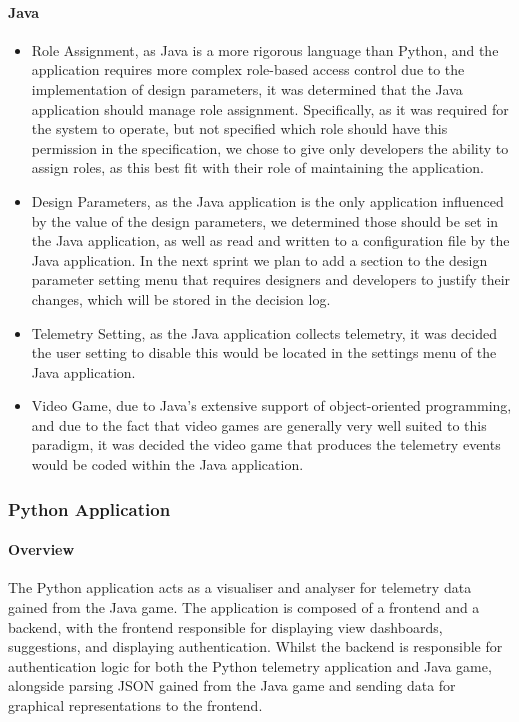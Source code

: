 \paragraph{Java}
\begin{itemize}
    \item Role Assignment, as Java is a more rigorous language than Python, and the application requires more complex role-based access control due to the implementation of design parameters, it was determined that the Java application should manage role assignment. Specifically, as it was required for the system to operate, but not specified which role should have this permission in the specification, we chose to give only developers the ability to assign roles, as this best fit with their role of maintaining the application.
    \item Design Parameters, as the Java application is the only application influenced by the value of the design parameters, we determined those should be set in the Java application, as well as read and written to a configuration file by the Java application. In the next sprint we plan to add a section to the design parameter setting menu that requires designers and developers to justify their changes, which will be stored in the decision log.
    \item Telemetry Setting, as the Java application collects telemetry, it was decided the user setting to disable this would be located in the settings menu of the Java application.
    \item Video Game, due to Java's extensive support of object-oriented programming, and due to the fact that video games are generally very well suited to this paradigm, it was decided the video game that produces the telemetry events would be coded within the Java application.
\end{itemize}

\subsubsection{Python Application}

\paragraph{Overview}
The Python application acts as a visualiser and analyser for telemetry data gained from the Java game. The application is composed of a frontend and a backend, with the frontend responsible for displaying view dashboards, suggestions, and displaying authentication. Whilst the backend is responsible for authentication logic for both the Python telemetry application and Java game, alongside parsing JSON gained from the Java game and sending data for graphical representations to the frontend.

